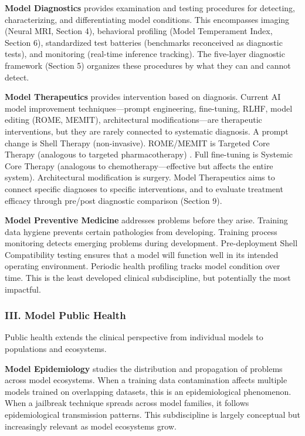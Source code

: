 \documentclass[11pt]{article}
\begin{document}
\textbf{Model Diagnostics} provides examination and testing procedures for detecting, characterizing, and differentiating model conditions. This encompasses imaging (Neural MRI, Section 4), behavioral profiling (Model Temperament Index, Section 6), standardized test batteries (benchmarks reconceived as diagnostic tests), and monitoring (real-time inference tracking). The five-layer diagnostic framework (Section 5) organizes these procedures by what they can and cannot detect.

\textbf{Model Therapeutics} provides intervention based on diagnosis. Current AI model improvement techniques---prompt engineering, fine-tuning, RLHF, model editing (ROME, MEMIT), architectural modifications---are therapeutic interventions, but they are rarely connected to systematic diagnosis. A prompt change is Shell Therapy (non-invasive). ROME/MEMIT is Targeted Core Therapy (analogous to targeted pharmacotherapy) \citep{Meng2022,Meng2023}. Full fine-tuning is Systemic Core Therapy (analogous to chemotherapy---effective but affects the entire system). Architectural modification is surgery. Model Therapeutics aims to connect specific diagnoses to specific interventions, and to evaluate treatment efficacy through pre/post diagnostic comparison (Section 9).

\textbf{Model Preventive Medicine} addresses problems before they arise. Training data hygiene prevents certain pathologies from developing. Training process monitoring detects emerging problems during development. Pre-deployment Shell Compatibility testing ensures that a model will function well in its intended operating environment. Periodic health profiling tracks model condition over time. This is the least developed clinical subdiscipline, but potentially the most impactful.

\subsubsection{III. Model Public Health}

Public health extends the clinical perspective from individual models to populations and ecosystems.

\textbf{Model Epidemiology} studies the distribution and propagation of problems across model ecosystems. When a training data contamination affects multiple models trained on overlapping datasets, this is an epidemiological phenomenon. When a jailbreak technique spreads across model families, it follows epidemiological transmission patterns. This subdiscipline is largely conceptual but increasingly relevant as model ecosystems grow.
\end{document}
